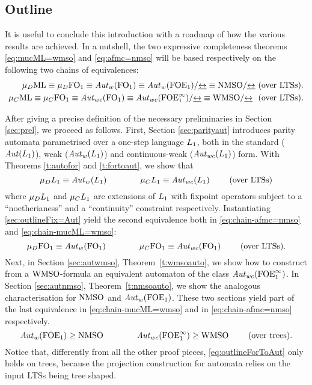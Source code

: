 \subsection{Outline}

It is useful to conclude this introduction with a roadmap of how the various results are achieved. In a nutshell, the two expressive completeness theorems \eqref{eq:mucML=wmso} and \eqref{eq:afmc=nmso} will be based respectively on the following two chains of equivalences:
\begin{eqnarray}
\AFMC \equiv \mu_{D}\ofo \equiv \AutW(\ofo) \equiv \AutW(\ofoe)/{\bis} \equiv \nmso/{\bis}  \ \text{(over  LTSs)}.\label{eq:chain-afmc=nmso}
\\
	\mucML \equiv \mu_{C}\ofo \equiv \AutWC(\ofo) \equiv \AutWC(\ofoei)/{\bis} \equiv \wmso/{\bis}  \ \text{  (over LTSs)}. \label{eq:chain-mucML=wmso}
\end{eqnarray}

After giving a precise definition of the necessary preliminaries in Section \ref{sec:prel}, we proceed as follows. 
First, Section \ref{sec:parityaut} introduces parity automata parametrised over 
a one-step language $L_{1}$, both in the standard ($\mathit{Aut}(L_{1})$), weak 
($\mathit{Aut}_{w}(L_{1})$) and continuous-weak ($\mathit{Aut}_{wc}(L_{1})$) form. 
With Theorems \ref{t:autofor} and \ref{t:fortoaut}, we show that
\begin{equation}\label{sec:outlineFix=Aut}
\mu_{D}\oslang\equiv \AutW(\oslang)  \qquad \qquad \mu_{C}\oslang \equiv \AutWC(\oslang)    \qquad\text{ (over LTSs)}
\end{equation}
where $\mu_{D}L_{1}$ and $\mu_{C}L_{1}$ are extensions of $L_{1}$ with fixpoint operators subject to a ``noetherianess'' and a ``continuity'' constraint respectively. Instantiating \eqref{sec:outlineFix=Aut} yield the second equivalence both in \eqref{eq:chain-afmc=nmso} and \eqref{eq:chain-mucML=wmso}:
\begin{equation*}
	 \mu_{D}\ofo \equiv \AutW(\ofo) \qquad \qquad \mu_{C}\ofo \equiv \AutWC(\ofo)  \qquad \text{ (over LTSs)}.
\end{equation*}
Next, in Section \ref{sec:autwmso}, Theorem~\ref{t:wmsoauto}, we show how to construct from a $\mathrm{WMSO}$-formula an equivalent automaton of the class $\mathit{Aut}_{wc}(\mathrm{FOE}^{\infty}_1)$. In Section \ref{sec:autnmso}, Theorem~\ref{t:nmsoauto}, we show the analogous characterisation for $\mathrm{NMSO}$ and $\mathit{Aut}_{w}(\mathrm{FOE}_1)$. These two sections yield part of the last equivalence in \eqref{eq:chain-mucML=wmso} and in \eqref{eq:chain-afmc=nmso} respectively. 
\begin{equation} \label{eq:outlineForToAut}
 \AutW(\ofoe) \geq \nmso \qquad \qquad {\AutWC(\ofoei)} \geq \wmso \qquad \text{ (over trees)}.
 \end{equation}
Notice that, differently from all the other proof pieces, \eqref{eq:outlineForToAut} only holds on trees, because the projection construction for automata relies on the input LTSs being tree shaped. 

